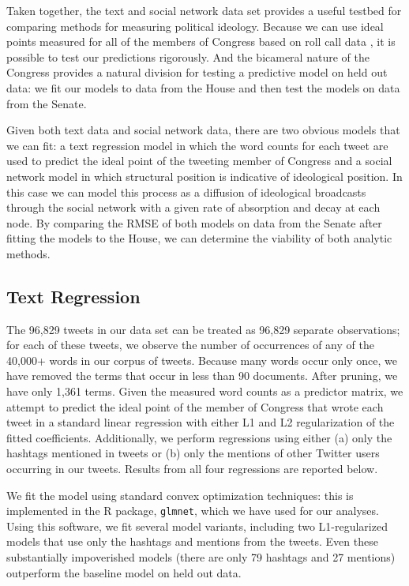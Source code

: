 \documentclass[10pt]{article}
\begin{document}
Taken together, the text and social network data set provides a useful testbed for comparing methods for measuring political ideology. Because we can use ideal points measured for all of the members of Congress based on roll call data \citep{Jackman_2001}, it is possible to test our predictions rigorously. And the bicameral nature of the Congress provides a natural division for testing a predictive model on held out data: we fit our models to data from the House and then test the models on data from the Senate.

Given both text data and social network data, there are two obvious models that we can fit: a text regression model in which the word counts for each tweet are used to predict the ideal point of the tweeting member of Congress and a social network model in which structural position is indicative of ideological position.  In this case we can model this process as a diffusion of ideological broadcasts through the social network with a given rate of absorption and decay at each node. By comparing the RMSE of both models on data from the Senate after fitting the models to the House, we can determine the viability of both analytic methods.

\subsection{Text Regression}

The 96,829 tweets in our data set can be treated as 96,829 separate observations; for each of these tweets, we observe the number of occurrences of any of the 40,000+ words in our corpus of tweets. Because many words occur only once, we have removed the terms that occur in less than 90 documents. After pruning, we have only 1,361 terms. Given the measured word counts as a predictor matrix, we attempt to predict the ideal point of the member of Congress that wrote each tweet in a standard linear regression with either L1 and L2 regularization of the fitted coefficients. Additionally, we perform regressions using either (a) only the hashtags mentioned in tweets or (b) only the mentions of other Twitter users occurring in our tweets. Results from all four regressions are reported below.

We fit the model using standard convex optimization techniques: this is implemented in the R package, \texttt{glmnet}, which we have used for our analyses. Using this software, we fit several model variants, including two L1-regularized models that use only the hashtags and mentions from the tweets. Even these substantially impoverished models (there are only 79 hashtags and 27 mentions) outperform the baseline model on held out data.
\end{document}
